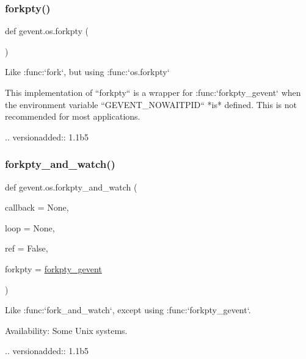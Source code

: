 \subsubsection{\texorpdfstring{forkpty()}{forkpty()}\hspace{0.1cm}{\footnotesize\ttfamily [2/2]}}
{\footnotesize\ttfamily def gevent.\+os.\+forkpty (\begin{DoxyParamCaption}{ }\end{DoxyParamCaption})}

\begin{DoxyVerb}Like :func:`fork`, but using :func:`os.forkpty`

This implementation of ``forkpty`` is a wrapper for :func:`forkpty_gevent`
when the environment variable ``GEVENT_NOWAITPID`` *is* defined.
This is not recommended for most applications.

.. versionadded:: 1.1b5
\end{DoxyVerb}
 \mbox{\label{namespacegevent_1_1os_a5115239646d7bd6a10bf4c24d07926b3}} 
\subsubsection{\texorpdfstring{forkpty\+\_\+and\+\_\+watch()}{forkpty\_and\_watch()}}
{\footnotesize\ttfamily def gevent.\+os.\+forkpty\+\_\+and\+\_\+watch (\begin{DoxyParamCaption}\item[{}]{callback = {\ttfamily None},  }\item[{}]{loop = {\ttfamily None},  }\item[{}]{ref = {\ttfamily False},  }\item[{}]{forkpty = {\ttfamily \hyperlink{namespacegevent_1_1os_a3e04fb5e868290aae691fd3a3a85a77e}{forkpty\+\_\+gevent}} }\end{DoxyParamCaption})}

\begin{DoxyVerb}Like :func:`fork_and_watch`, except using :func:`forkpty_gevent`.

Availability: Some Unix systems.

.. versionadded:: 1.1b5
\end{DoxyVerb}
 \mbox{\label{namespacegevent_1_1os_a3e04fb5e868290aae691fd3a3a85a77e}} 
